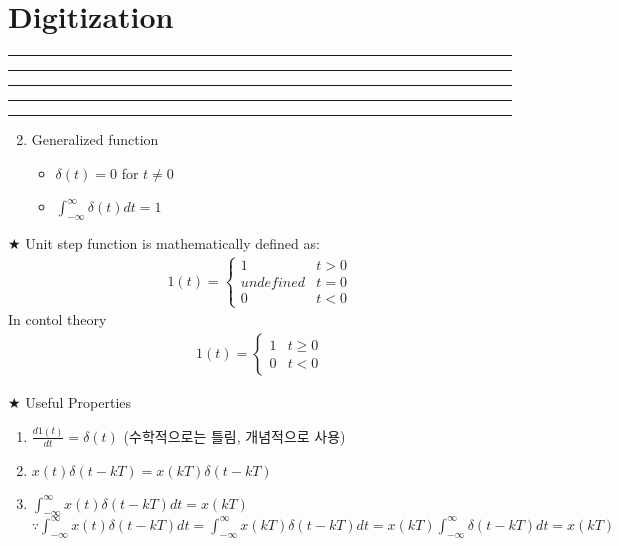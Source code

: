 \setcounter{chapter}{7}
\setcounter{section}{0}
\section{Digitization}
\vspace{-8pt} \hrule \hrule \hrule \hrule \hrule  \vspace{12pt}
\begin{enumerate}
	\setcounter{enumi}{1}
	\item Generalized function

	\begin{itemize}
			\centering
		\item $\delta(t) = 0$ for $ t \neq 0$ 
		\item $\int_{-\infty}^{\infty} \delta(t) dt = 1$ 
	\end{itemize}
\end{enumerate}

$\bigstar$ Unit step function is mathematically defined as:
\begin{align*}
	1(t) = \begin{cases}1 & t > 0\\ undefined & t = 0 \\0 & t< 0\end{cases}
\end{align*}
In contol theory
\begin{align*}
	1(t) = \begin{cases}1 & t \geq 0 \\0 & t< 0\end{cases}
\end{align*}



$\bigstar$ Useful Properties
 \begin{enumerate}
 	\item $\frac{d1(t)}{dt} = \delta(t) $ (수학적으로는 틀림, 개념적으로 사용)
 	\item $x(t)\delta(t-kT) = x(kT)\delta(t-kT)$
 	\item $\int_{-\infty}^{\infty} x(t) \delta(t-kT) dt= x(kT)$\\
		$ \because \int_{-\infty}^{\infty} x(t) \delta(t-kT)dt =\int_{-\infty}^{\infty} x(kT) \delta(t-kT) dt=x(kT)\int_{-\infty}^{\infty} \delta(t-kT) dt=x(kT)$
 	
 
 \end{enumerate}


